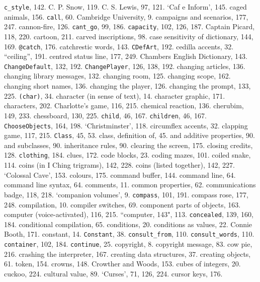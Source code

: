 {{\tt c\_style}}, 142.
C. P. Snow, 119.
C. S. Lewis, 97, 121.
`Caf{ e} Inform', 145.
caged animals, 156.
{{\tt call}}, 60.
Cambridge University, 9.
campaigns and scenarios, 177, 247.
cannon-fire, 126.
{{\tt cant\_go}}, 99, 186.
{{\tt capacity}}, 102, 126, 187.
Captain Picard, 118, 220.
cartoon, 211.
carved inscriptions, 98.
case sensitivity of dictionary, 144, 169.
{{\tt @catch}}, 176.
catchrestic words, 143.
{{\tt CDefArt}}, 192.
cedilla accents, 32.
``ceiling'', 191.
centred status line, 177, 249.
Chambers English Dictionary, 143.
{{\tt ChangeDefault}}, 132, 192.
{{\tt ChangePlayer}}, 126, 138, 192.
changing articles, 136.
changing library messages, 132.
changing room, 125.
changing scope, 162.
changing short names, 136.
changing the player, 126.
changing the prompt, 133, 225.
{{\tt (char)}}, 34.
character (in sense of text), 14.
character graphic, 171.
characters, 202.
Charlotte's game, 116, 215.
chemical reaction, 136.
cherubim, 149, 233.
chessboard, 130, 225.
{{\tt child}}, 46, 167.
{{\tt children}}, 46, 167.
{{\tt ChooseObjects}}, 164, 198.
`Christminster', 118.
circumflex accents, 32.
clapping game, 117, 215.
{{\tt Class}}, 45, 53.
class, definition of, 45.
\quad  and additive properties, 90.
\quad  and subclasses, 90.
\quad  inheritance rules, 90.
clearing the screen, 175.
closing credits, 128.
{{\tt clothing}}, 184.
clues, 172.
code blocks, 23.
coding mazes, 101.
coiled snake, 114.
coins (in I Ching trigrams), 142, 228.
coins (listed together), 142, 227.
`Colossal Cave', 153.
colours, 175.
command buffer, 144.
command line, 64.
command line syntax, 64.
comments, 11.
common properties, 62.
communications badge, 118, 218.
`companion volumes', 9.
{{\tt compass}}, 101, 191.
compass rose, 177, 248.
compilation, 10.
compiler switches, 69.
component parts of objects, 163.
computer (voice-activated), 116, 215.
``computer, 143", 113.
{{\tt concealed}}, 139, 160, 184.
conditional compilation, 65.
conditions, 20.
conditions as values, 22.
Connie Booth, 171.
constant, 14.
{{\tt Constant}}, 38.
{{\tt consult\_from}}, 110.
{{\tt consult\_words}}, 110.
{{\tt container}}, 102, 184.
{{\tt continue}}, 25.
copyright, 8.
copyright message, 83.
cow pie, 216.
crashing the interpreter, 167.
creating data structures, 37.
creating objects, 61.
 token, 154.
crowns, 148.
Crowther and Woods, 153.
cubes of integers, 20.
cuckoo, 224.
cultural value, 89.
`Curses', 71, 126, 224.
cursor keys, 176.

